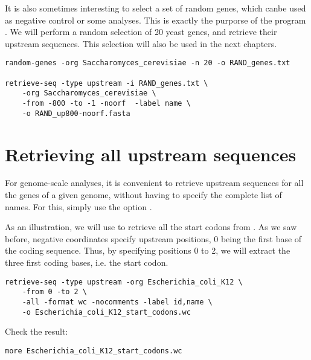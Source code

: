 It is also sometimes interesting to select a set of random genes,
which canbe used as negative control or some analyses. This is exactly
the purporse of the program . We will perform a
random selection of 20 yeast genes, and retrieve their upstream
sequences. This selection will also be used in the next chapters.


{\color{Blue} \begin{footnotesize}
\begin{verbatim}
random-genes -org Saccharomyces_cerevisiae -n 20 -o RAND_genes.txt

retrieve-seq -type upstream -i RAND_genes.txt \
    -org Saccharomyces_cerevisiae \
    -from -800 -to -1 -noorf  -label name \
    -o RAND_up800-noorf.fasta
\end{verbatim} \end{footnotesize}
}

\section{Retrieving all upstream sequences}

For genome-scale analyses, it is convenient to retrieve upstream
sequences for all the genes of a given genome, without having to
specify the complete list of names. For this, simply use the option
\option{-all}.

As an illustration, we will use \command{retrieve-seq} to retrieve all
the start codons from . As we saw before,
negative coordinates specify upstream positions, 0 being the first
base of the coding sequence. Thus, by specifying positions 0 to 2, we
will extract the three first coding bases, i.e. the start codon. 

{\color{Blue} \begin{footnotesize}
\begin{verbatim}
retrieve-seq -type upstream -org Escherichia_coli_K12 \
    -from 0 -to 2 \
    -all -format wc -nocomments -label id,name \
    -o Escherichia_coli_K12_start_codons.wc
\end{verbatim} \end{footnotesize}
}

Check the result:

{\color{Blue} \begin{footnotesize}
\begin{verbatim}
more Escherichia_coli_K12_start_codons.wc
\end{verbatim} \end{footnotesize}
}


